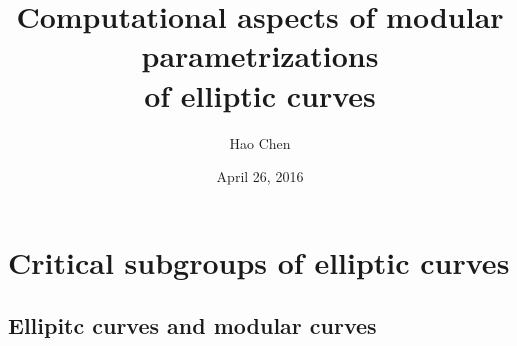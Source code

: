 \documentclass[handout]{beamer}
\title[thesis defense]{Computational aspects of modular parametrizations \\ of elliptic curves} %
\author{Hao Chen} %
\institute[UW] %
{
University of Washington Ph.D. defense \\ %
\medskip
Advisor: William Stein %
}
\date{April 26, 2016} %
\begin{document}
\begin{frame}
\titlepage %
\end{frame}


%



\section{Critical subgroups of elliptic curves} %

 \begin{frame}
 \frametitle{\insertsection}
 \tableofcontents[currentsection]
 \end{frame}

\subsection{Ellipitc curves and modular curves}
\end{document}
